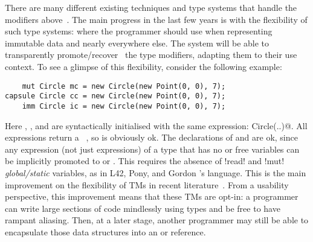 \noindent There are many different existing techniques and type systems that handle the modifiers above~\cite{ZibinEtAl10,ClarkeWrigstad03,HallerOdersky10,GordonEtAl12,ServettoZucca15}.
The main progress in the last few years is with the flexibility of such type systems:
 where the programmer should use \Q@imm@ when  representing immutable data
and \Q@mut@ nearly everywhere else. The system will be able to transparently promote/recover~\cite{GordonEtAl12,clebsch2015deny,ServettoZucca15} the type modifiers, adapting them to their use context.
To see a glimpse of this flexibility, consider the following example:
\begin{lstlisting}
    mut Circle mc = new Circle(new Point(0, 0), 7);
capsule Circle cc = new Circle(new Point(0, 0), 7);
    imm Circle ic = new Circle(new Point(0, 0), 7);
\end{lstlisting}

Here \Q@mc@, \Q@cc@, and \Q@ic@ are syntactically initialised with the same expression: \Q@new Circle(..)@. All
\Q@new@ expressions return a \Q@mut@~\cite{clebsch2015deny,GIANNINI2019145}, so \Q@mc@ is obviously ok. The declarations of \Q@cc@ and \Q@ic@ are ok, since 
any expression (not just \Q@new@ expressions) 
of a \Q@mut@ type that has no \Q@mut@ or \Q@read@ free 
variables can be implicitly promoted to \Q@capsule@ or \Q@imm@.
This requires the absence of \Q!read! and \Q!mut! \emph{global/static} variables, as in L42, Pony, and Gordon \etal's language.
This is the main improvement on the flexibility of TMs in recent literature~\cite{ServettoEtAl13a,ServettoZucca15,GordonEtAl12,clebsch2015deny,clebsch2017orca}.
From a usability perspective, this improvement means that
these TMs are opt-in: a programmer can write large sections of code
mindlessly using \Q@mut@ types and be free to have rampant aliasing. 
Then, at a later stage, another programmer may still 
be able to encapsulate those data structures into an \Q@imm@ or \Q@capsule@ reference.

